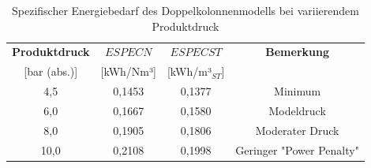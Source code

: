 \begin{table}[htbp]
\centering
\caption{Spezifischer Energiebedarf des Doppelkolonnenmodells bei variierendem Produktdruck}
\label{tab:spez_energie_doppel}
\begin{tabular}{cccc}
\hline
\textbf{Produktdruck} & \textbf{$ESPECN$} & \textbf{$ESPECST$} & \textbf{Bemerkung} \\
{[bar (abs.)]} & {[kWh/Nm³]} & {[kWh/m³$_{ST}$]} & \\ \hline
4,5 & 0,1453 & 0,1377 & Minimum\\
6,0 & 0,1667 & 0,1580 & Modeldruck \\
8,0 & 0,1905 & 0,1806 & Moderater Druck \\
10,0 & 0,2108 & 0,1998 & Geringer "Power Penalty" \\ \hline
\end{tabular}
\end{table}